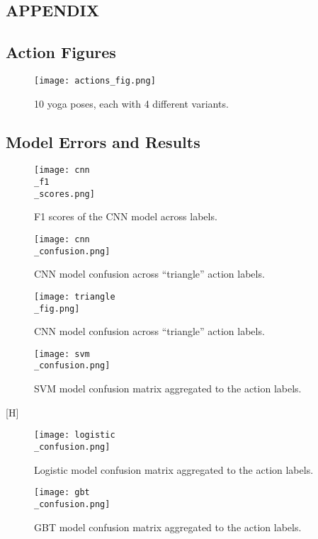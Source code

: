 \documentclass[
	a4paper, %
	10pt, %
	unnumberedsections, %
	twoside, %
]{t0004}
\begin{document}
\clearpage
\begin{appendices}

\onecolumn

\section*{APPENDIX}

\subsection{Action Figures}

\begin{figure}[H]
	\texttt{[image: actions\_fig.png]}
	\caption{10 yoga poses, each with 4 different variants.}
	\label{fig:actionsfig}
\end{figure}

\subsection{Model Errors and Results}

\begin{figure}[H]
	\texttt{[image: cnn\\\_f1\\\_scores.png]}
	\caption{F1 scores of the CNN model across labels.}
	\label{fig:f1cnn}
\end{figure}

\begin{figure}[H]
	\texttt{[image: cnn\\\_confusion.png]}
	\caption{CNN model confusion across ``triangle'' action labels.}
	\label{fig:f1cnn}
\end{figure}

\begin{figure}[H]
	\texttt{[image: triangle\\\_fig.png]}
	\caption{CNN model confusion across ``triangle'' action labels.}
	\label{fig:trianglecnn}
\end{figure}

\begin{figure}[H]
	\texttt{[image: svm\\\_confusion.png]}
	\caption{SVM model confusion matrix aggregated to the action labels.}
	\label{fig:svmconfusion}
\end{figure}[H]

\begin{figure}[H]
	\texttt{[image: logistic\\\_confusion.png]}
	\caption{Logistic model confusion matrix aggregated to the action labels.}
	\label{fig:logisticconfusion}
\end{figure}

\begin{figure}[H]
	\texttt{[image: gbt\\\_confusion.png]}
	\caption{GBT model confusion matrix aggregated to the action labels.}
	\label{fig:gbtconfusion}
\end{figure}

\end{appendices}
\end{document}
